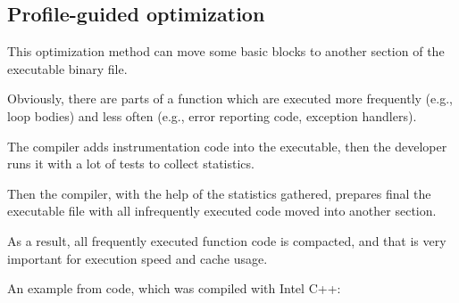 

\subsection{Profile-guided optimization}
\label{PGO}

\myindex{\oracle}

This optimization method can move some \gls{basic block}s to another section of the executable binary file.

Obviously, there are parts of a function which are executed more frequently (e.g., loop bodies)
and less often (e.g., error reporting code, exception handlers).

The compiler adds instrumentation code into the executable, then the developer runs it with
a lot of tests to collect statistics.

Then the compiler, with the help of the statistics gathered,
prepares final the executable file with all infrequently executed code moved into another section.

As a result, all frequently executed function code is compacted, and that is very important
for execution speed and cache usage.

An example from \oracle code, which was compiled with Intel C++:

